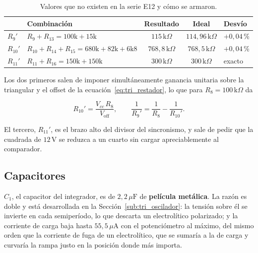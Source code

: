 \documentclass[12pt, a4paper, twoside]{report}
\begin{document}
\begin{table}[H]
  \centering
  \caption{Valores que no existen en la serie E12 y cómo se armaron.}
  \label{tab:val_combinaciones}
  \begin{tabular}{llccl}
    \toprule
    & Combinación & Resultado & Ideal & Desvío \\
    \midrule
    $R_9'$    & $R_9 + R_{13} = 100\text{k} + 15\text{k}$
              & $115\,\text{k}\Omega$ & $114{,}96\,\text{k}\Omega$ & $+0{,}04$\,\% \\
    $R_{10}'$ & $R_{10} + R_{14} + R_{15} = 680\text{k} + 82\text{k} + 6\text{k}8$
              & $768{,}8\,\text{k}\Omega$ & $768{,}5\,\text{k}\Omega$ & $+0{,}04$\,\% \\
    $R_{11}'$ & $R_{11} + R_{16} = 150\text{k} + 150\text{k}$
              & $300\,\text{k}\Omega$ & $300\,\text{k}\Omega$ & exacto \\
    \bottomrule
  \end{tabular}
\end{table}

Los dos primeros salen de imponer simultáneamente ganancia unitaria sobre
la triangular y el offset de la ecuación~\eqref{eq:tri_restador}, lo que
para $R_8 = 100\,\text{k}\Omega$ da

\begin{equation}
  R_{10}' = \frac{V_{cc}\,R_8}{V_\text{off}}, \qquad
  \frac{1}{R_9'} = \frac{1}{R_8} - \frac{1}{R_{10}'} .
  \label{eq:val_restador}
\end{equation}

El tercero, $R_{11}'$, es el brazo alto del divisor del sincronismo, y sale
de pedir que la cuadrada de $12\,\text{V}$ se reduzca a un cuarto sin
cargar apreciablemente al comparador.

\subsection{Capacitores}
\label{sub:val_capacitores}

$C_1$, el capacitor del integrador, es de $2{,}2\,\mu\text{F}$ de
\textbf{película metálica}. La razón es doble y está desarrollada en la
Sección~\ref{sub:tri_oscilador}: la tensión sobre él se invierte en cada
semiperíodo, lo que descarta un electrolítico polarizado; y la corriente de
carga baja hasta $55{,}5\,\mu\text{A}$ con el potenciómetro al máximo, del
mismo orden que la corriente de fuga de un electrolítico, que se sumaría a
la de carga y curvaría la rampa justo en la posición donde más importa.
\end{document}
